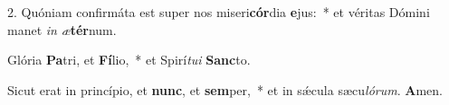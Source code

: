 2. Quóniam confirmáta est super nos miseri\textbf{cór}dia \textbf{e}jus:~* et véritas Dómini manet \textit{in} \textit{æ}\textbf{tér}num.

Glória \textbf{Pa}tri, et \textbf{Fí}lio,~* et Spirí\textit{tu}\textit{i} \textbf{Sanc}to.

Sicut erat in princípio, et \textbf{nunc}, et \textbf{sem}per,~* et in sǽcula sæcu\textit{ló}\textit{rum}. \textbf{A}men.